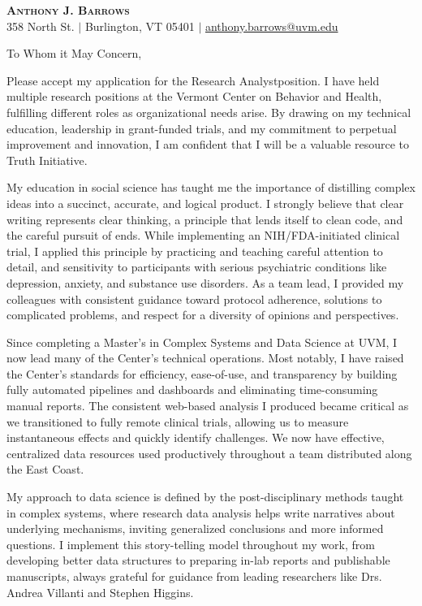 \documentclass[letterpaper,11pt]{article}
\newcommand{\company}{Truth Initiative}
\newcommand{\position}{Research Analyst}
\begin{document}
\begin{center}
    \textbf{\Huge \scshape Anthony J. Barrows} \\ \vspace{3pt}
    \small 358 North St. $|$
    \small Burlington, VT 05401 $|$
    \href{mailto:ajbarrow@uvm.edu}{anthony.barrows@uvm.edu}
\end{center}
\vspace{5mm}
	
	To Whom it May Concern,
	\vspace{3mm}
	
	Please accept my application for the \position \space position. I have held multiple research positions at the Vermont Center on Behavior and Health, fulfilling different roles as organizational needs arise. By drawing on my technical education, leadership in grant-funded trials, and my commitment to perpetual improvement and innovation, I am confident that I will be a valuable resource to \company.
	
	
	My education in social science has taught me the importance of distilling complex ideas into a succinct, accurate, and logical product. I strongly believe that clear writing represents clear thinking, a principle that lends itself to clean code, and the careful pursuit of ends. While implementing an NIH/FDA-initiated clinical trial, I applied this principle by practicing and teaching careful attention to detail, and sensitivity to participants with serious psychiatric conditions like depression, anxiety, and substance use disorders. As a team lead, I provided my colleagues with consistent guidance toward protocol adherence, solutions to complicated problems, and respect for a diversity of opinions and perspectives.
	
	
	Since completing a Master's in Complex Systems and Data Science at UVM, I now lead many of the Center's technical operations. Most notably, I have raised the Center’s standards for efficiency, ease-of-use, and transparency by building fully automated pipelines and dashboards and eliminating time-consuming manual reports. The consistent web-based analysis I produced became critical as we transitioned to fully remote clinical trials, allowing us to measure instantaneous effects and quickly identify challenges. We now have effective, centralized data resources used productively throughout a team distributed along the East Coast. 
	
	My approach to data science is defined by the post-disciplinary methods taught in complex systems, where research data analysis helps write narratives about underlying mechanisms, inviting generalized conclusions and more informed questions. I implement this story-telling model throughout my work, from developing better data structures to preparing in-lab reports and publishable manuscripts, always grateful for guidance from leading researchers like Drs. Andrea Villanti and Stephen Higgins.
	
\end{document}

